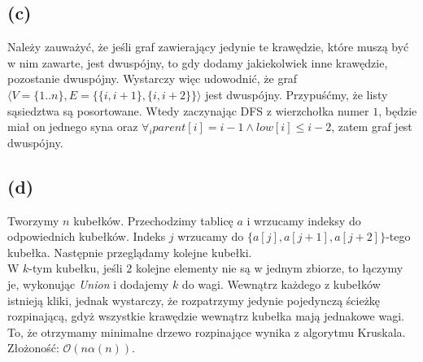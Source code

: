\documentclass[12pt, a4paper]{article}
\newcommand{\MCALO}{\mathcal{O}}
\begin{document}
\subsection*{(c)}
Należy zauważyć, że jeśli graf zawierający jedynie te krawędzie, które muszą
być w nim zawarte, jest dwuspójny, to gdy dodamy jakiekolwiek inne krawędzie,
pozostanie dwuspójny. Wystarczy więc udowodnić, że graf
$\langle V=\{1..n\},E = \{ \{i,i+1\} , \{i,i+2\} \}\rangle$
jest dwuspójny. Przypuśćmy, że listy sąsiedztwa są posortowane. Wtedy
zaczynając DFS z wierzchołka numer $1$, będzie miał on jednego syna oraz
$\forall_i parent[i] = i-1 \land low[i] \le i-2$, zatem graf jest dwuspójny.

\subsection*{(d)}
Tworzymy $n$ kubełków. Przechodzimy tablicę $a$ i wrzucamy indeksy do
odpowiednich kubełków. Indeks $j$ wrzucamy do $\{a[j],a[j+1],a[j+2]\}$-tego
kubełka. Następnie przeglądamy kolejne kubełki.\\ W $k$-tym kubełku, jeśli $2$
kolejne elementy nie są w jednym zbiorze, to łączymy je, wykonując
\textit{Union} i dodajemy $k$ do wagi. Wewnątrz każdego z kubełków istnieją
kliki, jednak wystarczy, że rozpatrzymy jedynie pojedynczą ścieżkę rozpinającą,
gdyż wszystkie krawędzie wewnątrz kubełka mają jednakowe wagi. To, że otrzymamy
minimalne drzewo rozpinające wynika z algorytmu Kruskala.
Złożoność: $\MCALO(n\alpha(n))$.
\end{document}
